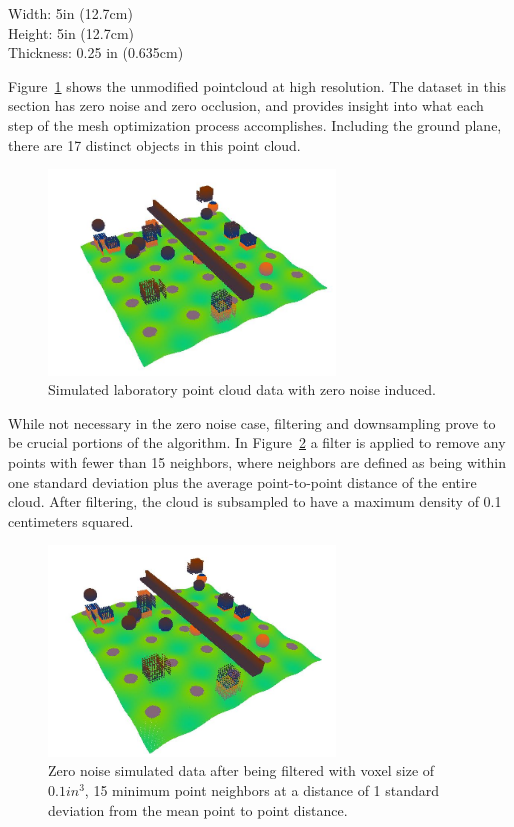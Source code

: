 \documentclass[12pt]{drexelthesis}
\begin{document}
\begin{centering}
Width: 5in (12.7cm)
\\Height: 5in (12.7cm)
\\Thickness: 0.25 in (0.635cm) \\
\end{centering}

Figure~\ref{zeronoise:raw} shows the unmodified pointcloud at high resolution. The dataset in this section has zero noise and zero occlusion, and provides insight into what each step of the mesh optimization process accomplishes. Including the ground plane, there are 17 distinct objects in this point cloud.


\begin{figure}[!ht]
		\centering
		\includegraphics[width=3in]{simulated-lab-scan/0noise/sim-lab-0noise.jpg}
		\caption[Simulated laboratory point cloud data with zero noise induced]{\centering Simulated laboratory point cloud data with zero noise induced.}
	\label{zeronoise:raw}
\end{figure}


While not necessary in the zero noise case, filtering and downsampling prove to be crucial portions of the algorithm. In Figure~\ref{zeronoise:filtered} a filter is applied to remove any points with fewer than 15 neighbors, where neighbors are defined as being within one standard deviation plus the average point-to-point distance of the entire cloud. After filtering, the cloud is subsampled to have a maximum density of 0.1 centimeters squared.


\begin{figure}[!ht]
	\centering
		\includegraphics[width=3in]{simulated-lab-scan/0noise/sim-lab-0noise-DS01-k15std1.jpg}
		\caption[Zero noise simulated data after being filtered with voxel size of 0.1 $in^{3}$, 15 minimum point neighbors at a distance of 1 standard deviation from the mean point to point distance]{\centering Zero noise simulated data after being filtered with voxel size of $0.1 in^{3}$, 15 minimum point neighbors at a distance of 1 standard deviation from the mean point to point distance.}
	\label{zeronoise:filtered}
\end{figure}
\end{document}
